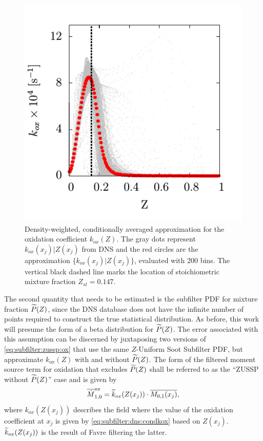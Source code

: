 \begin{figure}[htb]
  \centering
  \includegraphics[width=0.43\linewidth]{ch-subfiltermodeling/figures/koxvsz}
  \caption[Approximation for Oxidation Coefficient, \texorpdfstring{$k_{ox}(Z)$}{kox(Z)}]{Density-weighted, conditionally averaged approximation for the oxidation coefficient $k_{ox}(Z)$. The gray dots represent $k_{ox}(x_j)|Z(x_j)$ from DNS and the red circles are the approximation $\{ k_{ox}(x_j)|Z(x_j) \}$, evaluated with 200 bins. The vertical black dashed line marks the location of stoichiometric mixture fraction $Z_{st} = 0.147$.}
  \label{fig:subfilter:dns:kox}
\end{figure}

The second quantity that needs to be estimated is the subfilter PDF for mixture fraction $\pz$, since the DNS database does not have the infinite number of points required to construct the true statistical distribution. As before, this work will presume the form of a beta distribution for $\pz$. The error associated with this assumption can be discerned by juxtaposing two versions of \cref{eq:subfilter:zussp:ox} that use the same $Z$-Uniform Soot Subfilter PDF, but approximate $k_{ox}(Z)$ with and without $\pz$. The form of the filtered moment source term for oxidation that excludes $\pz$ shall be referred to as the ``ZUSSP without $\pz$'' case and is given by
\begin{equation}\label{eq:subfilter:dns:mzusspwithoutpz}
  \fst[M]{1,0}^{ox} = \tf{k}_{ox}(Z(x_j)) \cdot \mean{M_{0,1}(x_j)},
\end{equation}
where $k_{ox}(Z(x_j))$ describes the field where the value of the oxidation coefficient at $x_j$ is given by \cref{eq:subfilter:dns:condkox} based on $Z(x_j)$. $\tf{k}_{ox}(Z(x_j))$ is the result of Favre filtering the latter.

